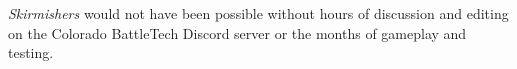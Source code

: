 \emph{Skirmishers} would not have been possible without hours of discussion and editing on the Colorado BattleTech Discord server or the months of gameplay and testing.


